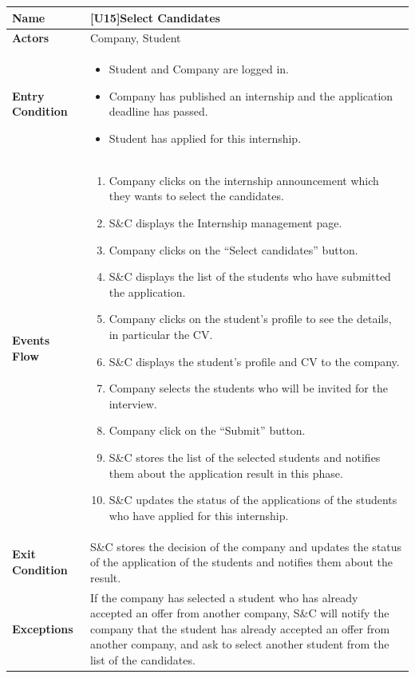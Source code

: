 \begin{center}
    \begin{tabular}{|p{9em}|p{27em}|}
        \hline
        \rowcolor{bluepoli!40} %
        \textbf{Name} & \textbf{[U15]Select Candidates} \\
        \hline
        \textbf{Actors} & Company, Student\\
        \hline
        \textbf{Entry Condition} & 
        \begin{itemize}
            \item Student and Company are logged in.
            \item Company has published an internship and the application deadline has passed.
            \item Student has applied for this internship.
        \end{itemize} \\
        \hline
        \textbf{Events Flow} & 
        \begin{enumerate}
            \item Company clicks on the internship announcement which they wants to select the candidates.
            \item S\&C displays the Internship management page.
            \item Company clicks on the ``Select candidates'' button.
            \item S\&C displays the list of the students who have submitted the application.
            \item Company clicks on the student's profile to see the details, in particular the CV.\@
            \item S\&C displays the student's profile and CV to the company.
            \item Company selects the students who will be invited for the interview.
            \item Company click on the ``Submit'' button.
            \item S\&C stores the list of the selected students and notifies them about the application result in this phase.
            \item S\&C updates the status of the applications of the students who have applied for this internship.
        \end{enumerate} \\
        \hline
        \textbf{Exit Condition} & 
        S\&C stores the decision of the company and updates the status of the application of the students and notifies them about the result.\\
        \hline
        \textbf{Exceptions} &
         If the company has selected a student who has already accepted an offer from another company, S\&C will notify the company 
         that the student has already accepted an offer from another company, and ask to select another student from the list of the candidates.


\end{tabular}
\end{center}
